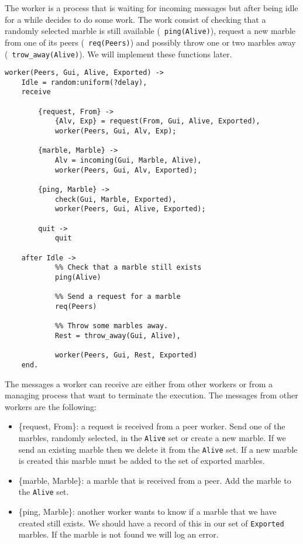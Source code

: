\documentclass[a4paper,11pt]{article}
\begin{document}
The worker is a process that is waiting for incoming messages but
after being idle for a while decides to do some work. The work consist
of checking that a randomly selected marble is still available ({\tt
  ping(Alive)}), request a new marble from one of its peers ({\tt
  req(Peers)}) and possibly throw one or two marbles away ({\tt
  trow\_away(Alive)}). We will implement these functions later.

\begin{verbatim}            
worker(Peers, Gui, Alive, Exported) ->
    Idle = random:uniform(?delay),
    receive

        {request, From} ->
            {Alv, Exp} = request(From, Gui, Alive, Exported),
            worker(Peers, Gui, Alv, Exp);        

        {marble, Marble} ->
            Alv = incoming(Gui, Marble, Alive),
            worker(Peers, Gui, Alv, Exported);
            
        {ping, Marble} ->
            check(Gui, Marble, Exported),
            worker(Peers, Gui, Alive, Exported);            

        quit ->
            quit

    after Idle ->
            %% Check that a marble still exists
            ping(Alive)

            %% Send a request for a marble 
            req(Peers)
            
            %% Throw some marbles away.
            Rest = throw_away(Gui, Alive),

            worker(Peers, Gui, Rest, Exported)
    end.            
\end{verbatim}

The messages a worker can receive are either from other workers or
from a managing process that want to terminate the execution. The
messages from other workers are the following:

\begin{itemize}
\item {\{request, From\}:} a request is received from a peer worker.
  Send one of the marbles, randomly selected, in the {\tt Alive} set
  or create a new marble. If we send an existing marble then we delete
  it from the {\tt Alive} set. If a new marble is created this
  marble must be added to the set of exported marbles.

\item {\{marble, Marble\}:} a marble that is received from a peer. Add
  the marble to the {\tt Alive} set.

\item {\{ping, Marble\}:} another worker wants to know if a marble
  that we have created still exists. We should have a record of this
  in our set of {\tt Exported} marbles. If the marble is not found we
  will log an error.

\end{itemize}
\end{document}
